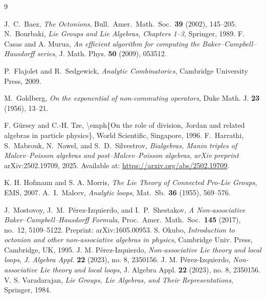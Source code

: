 \documentclass[11pt]{amsart}
\numberwithin{equation}{section}
\theoremstyle{remark}
\begin{document}
\begin{thebibliography}{9}

J.~C.~Baez,
\emph{The Octonions},
Bull.\ Amer.\ Math.\ Soc.\ \textbf{39} (2002), 145--205.
N.~Bourbaki,
\emph{Lie Groups and Lie Algebras, Chapters 1--3},
Springer, 1989.
F. Casas and A. Murua, \emph{An efficient algorithm for computing the Baker--Campbell--Hausdorff series}, J. Math. Phys. \textbf{50} (2009), 053512.

P.~Flajolet and R.~Sedgewick,
\emph{Analytic Combinatorics},
Cambridge University Press, 2009.



M.~Goldberg,
\emph{On the exponential of non-commuting operators},
Duke Math. J. \textbf{23} (1956), 13--21.


 F. Gürsey and C.-H. Tze, \textbackslash{}emph\{On the role of division, Jordan and related algebras in particle physics\}, World Scientific, Singapore, 1996.
F.~Harrathi, S.~Mabrouk, N.~Nawel, and S.~D.~Silvestrov,
\newblock \emph{Bialgebras, Manin triples of Malcev--Poisson algebras and post--Malcev--Poisson algebras},
\newblock \textit{arXiv preprint} arXiv:2502.19709, 2025.
\newblock Available at: \url{https://arxiv.org/abs/2502.19709}.


 K. H. Hofmann and S. A. Morris, \emph{The Lie Theory of Connected Pro-Lie Groups}, EMS, 2007.
A.~I.~Malcev,
\emph{Analytic loops},
Mat.\ Sb.\ \textbf{36} (1955), 569--576.

J.~Mostovoy, J.~M.~P\'erez-Izquierdo, and I.~P.~Shestakov,
\emph{A Non-associative Baker--Campbell--Hausdorff Formula},
Proc.\ Amer.\ Math.\ Soc.\ \textbf{145} (2017), no.~12, 5109--5122.
Preprint: arXiv:1605.00953.
 S. Okubo, \emph{Introduction to octonion and other non-associative algebras in physics}, Cambridge Univ. Press, Cambridge, UK, 1995.
 J. M. Pérez-Izquierdo, \emph{Non-associative Lie theory and local loops}, \emph{J. Algebra Appl.} \textbf{22} (2023), no. 8, 2350156.
J. M. Pérez-Izquierdo,
\emph{Non-associative Lie theory and local loops},
J. Algebra Appl. \textbf{22} (2023), no. 8, 2350156.
V. S. Varadarajan, \emph{Lie Groups, Lie Algebras, and Their Representations}, Springer, 1984.
\end{thebibliography}
\end{document}
